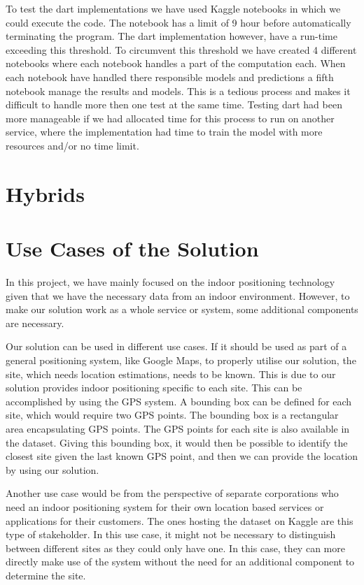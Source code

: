 To test the \gls{dart} implementations we have used Kaggle notebooks in which we could execute the code. The notebook has a limit of 9 hour before automatically terminating the program. The \gls{dart} implementation however, have a run-time exceeding this threshold. To circumvent this threshold we have created 4 different notebooks where each notebook handles a part of the computation each. When each notebook have handled there responsible models and predictions a fifth notebook manage the results and models. This is a tedious process and makes it difficult to handle more then one test at the same time. Testing \gls{dart} had been more manageable if we had allocated time for this process to run on another service, where the implementation had time to train the model with more resources and/or no time limit.

\section{Hybrids}

\section{Use Cases of the Solution}
In this project, we have mainly focused on the indoor positioning technology given that we have the necessary data from an indoor environment. However, to make our solution work as a whole service or system, some additional components are necessary. 

Our solution can be used in different use cases. If it should be used as part of a general positioning system, like Google Maps, to properly utilise our solution, the site, which needs location estimations, needs to be known. This is due to our solution provides indoor positioning specific to each site. This can be accomplished by using the GPS system. A bounding box can be defined for each site, which would require two GPS points. The bounding box is a rectangular area encapsulating GPS points. The GPS points for each site is also available in the dataset. Giving this bounding box, it would then be possible to identify the closest site given the last known GPS point, and then we can provide the location by using our solution.

Another use case would be from the perspective of separate corporations who need an indoor positioning system for their own location based services or applications for their customers. The ones hosting the dataset on Kaggle are this type of stakeholder. In this use case, it might not be necessary to distinguish between different sites as they could only have one. In this case, they can more directly make use of the system without the need for an additional component to determine the site.